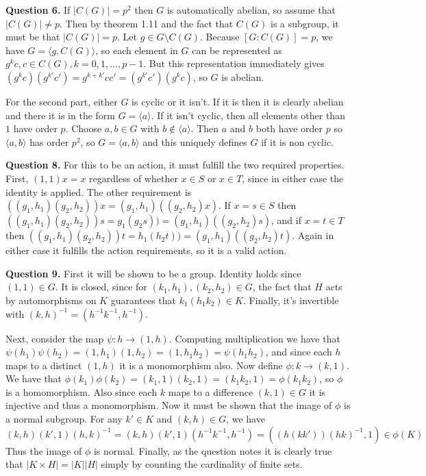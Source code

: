 \documentclass[letterpaper, reqno,11pt]{article}
\begin{document}
{\medskip\noindent\bf Question 6.} If $|C(G)|=p^2$ then $G$ is automatically abelian, so assume that $|C(G)|\neq p$. Then by theorem 1.11 and the fact that $C(G)$ is a subgroup, it must be that $|C(G)|=p$. Let $g\in G\setminus C(G)$. Because $[G:C(G)]=p$, we have $G=\langle g,C(G)\rangle$, so each element in $G$ can be represented as $g^{k}c,c\in C(G),k=0,1,\ldots,p-1$. But this representation immediately gives $(g^{k}c)(g^{k'}c')=g^{k+k'}cc'=(g^{k'}c')(g^{k}c)$, so $G$ is abelian.

For the second part, either $G$ is cyclic or it isn't. If it is then it is clearly abelian and there it is in the form $G=\langle a\rangle$. If it isn't cyclic, then all elements other than $1$ have order $p$. Choose $a,b\in G$ with $b\notin \langle a\rangle$. Then $a$ and $b$ both have order $p$ so $\langle a,b\rangle$ has order $p^2$, so $G=\langle a,b\rangle$ and this uniquely defines $G$ if it is non cyclic.

{\medskip\noindent\bf Question 8.} For this to be an action, it must fulfill the two required properties. First, $(1,1)x=x$ regardless of whether $x\in S$ or $x\in T$, since in either case the identity is applied. The other requirement is $((g_1,h_1)(g_2,h_2))x=(g_1,h_1)((g_2,h_2)x)$. If $x=s\in S$ then $((g_1,h_1)(g_2,h_2))s=g_1(g_2s))=(g_1,h_1)((g_2,h_2)s)$, and if $x=t\in T$ then $((g_1,h_1)(g_2,h_2))t=h_1(h_2t))=(g_1,h_1)((g_2,h_2)t)$. Again in either case it fulfills the action requirements, so it is a valid action.

{\medskip\noindent\bf Question 9.} First it will be shown to be a group. Identity holds since $(1,1)\in G$. It is closed, since for $(k_1,h_1),(k_2,h_2)\in G$, the fact that $H$ acts by automorphisms on $K$ guarantees that $k_1(h_1k_2)\in K$. Finally, it's invertible with $(k,h)^{-1}=(h^{-1}k^{-1},h^{-1})$.

Next, consider the map $\psi:h\to (1,h)$. Computing multiplication we have that $\psi(h_1)\psi(h_2)=(1,h_1)(1,h_2)=(1,h_1h_2)=\psi(h_1h_2)$, and since each $h$ maps to a distinct $(1,h)$ it is a monomorphism also. Now define $\phi: k\to (k,1)$. We have that $\phi(k_1)\phi(k_2)=(k_1,1)(k_2,1)=(k_1k_2,1)=\phi(k_1k_2)$, so $\phi$ is a homomorphism. Also since each $k$ maps to a difference $(k,1)\in G$ it is injective and thus a monomorphism. Now it must be shown that the image of $\phi$ is a normal subgroup. For any $k'\in K$ and $(k,h)\in G$, we have
\[
    (k,h)(k',1)(h,k)^{-1}=(k,h)(k',1)(h^{-1}k^{-1},h^{-1})=((h(kk'))(hk)^{-1},1)\in \phi(K)
\]
Thus the image of $\phi$ is normal. Finally, as the question notes it is clearly true that $|K\times H|=|K| |H|$ simply by counting the cardinality of finite sets.
\end{document}
